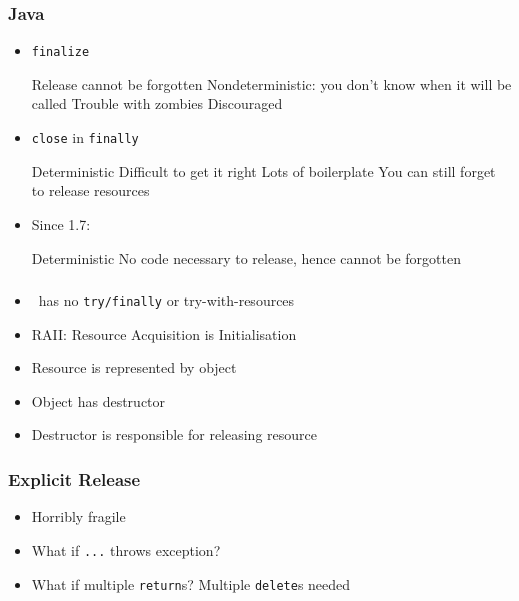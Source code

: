 \begin{frame}
  \frametitle{Java}
  \begin{itemize}
    \item {\tt finalize}
          \begin{procontralist}
            \pro Release cannot be forgotten
            \con Nondeterministic: you don't know when it will be called
            \con Trouble with zombies
            \con Discouraged
          \end{procontralist}
    \item {\tt close} in {\tt finally}
          \begin{procontralist}
            \pro Deterministic
            \con Difficult to get it right
            \con Lots of boilerplate
            \con You can still forget to release resources
          \end{procontralist}
    \item Since 1.7: 
          \begin{procontralist}
            \pro Deterministic
            \pro No code necessary to release, hence cannot be forgotten
          \end{procontralist}
  \end{itemize}
\end{frame}

\begin{frame}
  \frametitle{\cpp}
  \begin{itemize}
    \item \cpp\ has no \texttt{try/finally} or try-with-resources
    \item RAII: Resource Acquisition is Initialisation
    \item Resource is represented by object
    \item Object has destructor
    \item Destructor is responsible for releasing resource
  \end{itemize}
\end{frame}

\begin{frame}
  \frametitle{Explicit Release}
  \begin{itemize}
    \item Horribly fragile
    \item What if {\tt ...} throws exception?
    \item What if multiple {\tt return}s? Multiple {\tt delete}s needed
  \end{itemize}
\end{frame}

